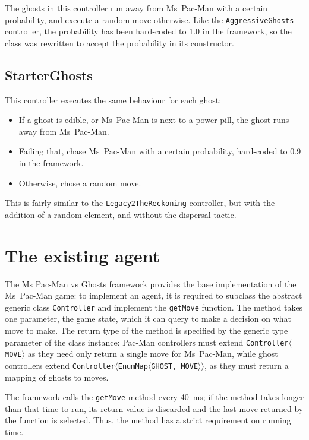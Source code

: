The ghosts in this controller run away from Ms~Pac-Man with a certain probability, and execute a random move otherwise.  Like the {\tt AggressiveGhosts} controller, the probability has been hard-coded to 1.0 in the framework, so the class was rewritten to accept the probability in its constructor.

\subsection{StarterGhosts}

This controller executes the same behaviour for each ghost:

\begin{itemize}
\item If a ghost is edible, or Ms~Pac-Man is next to a power pill, the ghost runs away from Ms~Pac-Man.
\item Failing that, chase Ms~Pac-Man with a certain probability, hard-coded to 0.9 in the framework.
\item Otherwise, chose a random move.
\end{itemize}

This is fairly similar to the {\tt Legacy2TheReckoning} controller, but with the addition of a random element, and without the dispersal tactic.

\section{The existing agent}
\label{sec:existingagent}

The Ms Pac-Man vs Ghosts framework provides the base implementation of the Ms~Pac-Man game: to implement an agent, it is required to subclass the abstract generic class {\tt Controller} and implement the {\tt getMove} function.  The method takes one parameter, the game state, which it can query to make a decision on what move to make.  The return type of the method is specified by the generic type parameter of the class instance:  Pac-Man controllers must extend {\tt Controller{$\langle$}MOVE{$\rangle$}} as they need only return a single move for Ms~Pac-Man, while ghost controllers extend {\tt Controller{$\langle$}EnumMap{$\langle$}GHOST, MOVE{$\rangle\rangle$}}, as they must return a mapping of ghosts to moves.

The framework calls the {\tt getMove} method every 40~ms; if the method takes longer than that time to run, its return value is discarded and the last move returned by the function is selected.  Thus, the method has a strict requirement on running time.

